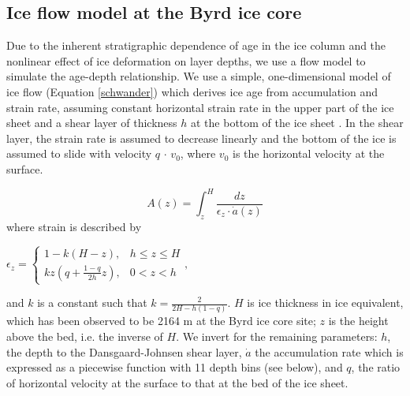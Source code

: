 \subsection{Ice flow model at the Byrd ice core}

Due to the inherent stratigraphic dependence of age in the ice column and the nonlinear effect of ice deformation on layer depths, we use a flow model to simulate the age-depth relationship. We use a simple, one-dimensional model of ice flow (Equation \ref{schwander}) which derives ice age from accumulation and strain rate, assuming constant horizontal strain rate in the upper part of the ice sheet and a shear layer of thickness $h$ at the bottom of the ice sheet \citep{schwander2001}. In the shear layer, the strain rate is assumed to decrease linearly and the bottom of the ice is assumed to slide with velocity $q$ $\cdot$ $v_0$, where $v_0$ is the horizontal velocity at the surface.

\begin{equation}\label{schwander}
A(z) = \int_{z}^{H} \frac{dz}{\epsilon_z \cdot \dot{a}(z)}
\end{equation}
where strain is described by
\begin{center}
$    \epsilon_z=
    \begin{cases}
                 1-k(H-z), & h \leq z \leq H \\
                  kz(q+\frac{1-q}{2h}z), & 0 < z < h
    \end{cases}, 
$

\end{center}
and $k$ is a constant such that $k = \frac{2}{2H - h(1-q)}$. $H$ is ice thickness in ice equivalent, which has been observed to be 2164 m at the Byrd ice core site; $z$ is the height above the bed, i.e. the inverse of $H$. We invert for the remaining parameters: $h$, the depth to the Dansgaard-Johnsen shear layer, $\dot{a}$ the accumulation rate which is expressed as a piecewise function with 11 depth bins (see below), and $q$, the ratio of horizontal velocity at the surface to that at the bed of the ice sheet.

